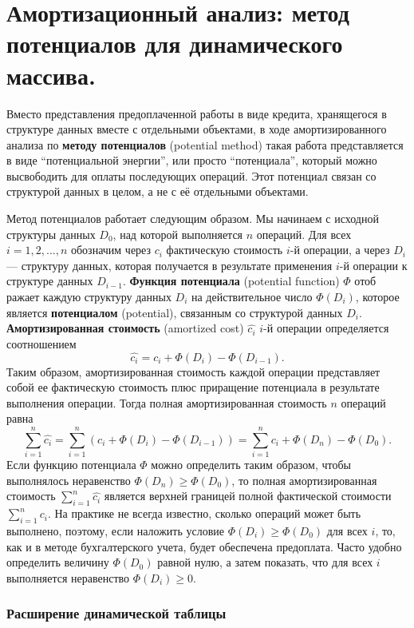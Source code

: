 \section{Амортизационный анализ: метод потенциалов для динамического массива. }

Вместо представления предоплаченной работы в виде кредита, хранящегося в структуре данных вместе с отдельными объектами, в ходе амортизированного анализа по \textbf{методу потенциалов} (potential method) такая работа представляется в виде “потенциальной энергии”, или просто “потенциала”, который можно высвободить для оплаты последующих операций.
Этот потенциал связан со структурой данных в целом, а не с её отдельными объектами.

Метод потенциалов работает следующим образом. Мы начинаем с исходной структуры данных $D_0$, над которой выполняется $n$ операций.
Для всех $i = 1,2,...,n$ обозначим через $c_i$ фактическую стоимость $i$-й операции, а через $D_i$ --- структуру данных, которая получается в результате применения $i$-й операции к структуре данных $D_{i - 1}$.
\textbf{Функция потенциала} (potential function) $\Phi$ отоб
ражает каждую структуру данных $D_i$ на действительное число $\Phi(D_i)$, которое является \textbf{потенциалом} (potential), связанным со структурой данных $D_i$.
\textbf{Амортизированная стоимость} (amortized cost) $\hat{c_i}$ $i$-й операции определяется соотношением $$\hat{c_i} = c_i + \Phi(D_i) - \Phi(D_{i - 1}).$$
Таким образом, амортизированная стоимость каждой операции представляет собой ее фактическую стоимость плюс приращение потенциала в результате выполнения операции.
Тогда полная амортизированная стоимость $n$ операций равна $$\sum_{i = 1}^n \hat{c_i} = \sum_{i = 1}^n (c_i + \Phi(D_i) - \Phi(D_{i - 1})) = \sum_{i = 1}^n c_i + \Phi(D_n) - \Phi(D_0).$$
Если функцию потенциала $\Phi$ можно определить таким образом, чтобы выполнялось неравенство $\Phi(D_n) \ge \Phi(D_0)$, то полная амортизированная стоимость $\sum_{i = 1}^n \hat{c_i}$ является верхней границей полной фактической стоимости $\sum_{i = 1}^n c_i$.
На практике не всегда известно, сколько операций может быть выполнено, поэтому, если наложить условие $\Phi(D_i) \ge \Phi(D_0)$ для всех $i$, то, как и в методе бухгалтерского учета, будет обеспечена предоплата.
Часто удобно определить величину $\Phi(D_0)$ равной нулю, а затем показать, что для всех $i$ выполняется неравенство $\Phi(D_i) \ge 0$.

\subsubsection{Расширение динамической таблицы}

